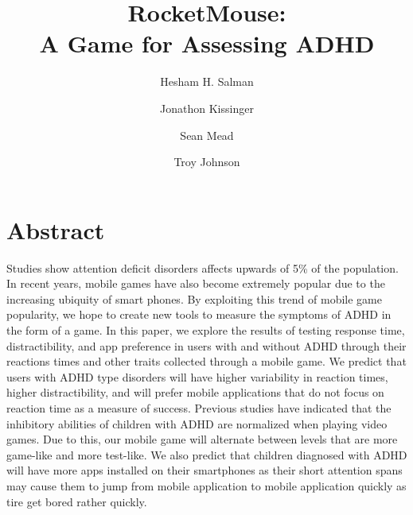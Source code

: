 \documentclass[a4wide]{article}
\title{RocketMouse:\\ A Game for Assessing ADHD}
\author{Hesham H. Salman \and Jonathon Kissinger \and Sean Mead \and Troy Johnson}
\begin{document}
\maketitle


\section{Abstract}
\- Studies show attention deficit disorders affects upwards of 5\% of the population. In recent years, mobile games have also become extremely popular due to the increasing ubiquity of smart phones. By exploiting this trend of mobile game popularity, we hope to create new tools to measure the symptoms of ADHD in the form of a game. In this paper, we explore the results of testing response time, distractibility, and app preference in users with and without ADHD through their reactions times and other traits collected through a mobile game.  We predict that users with ADHD type disorders will have higher variability in reaction times, higher distractibility, and will prefer mobile applications that do not focus on reaction time as a measure of success. Previous studies have indicated that the inhibitory abilities of children with ADHD are normalized when playing video games. Due to this, our mobile game will alternate between levels that are more game-like and more test-like. We also predict that children diagnosed with ADHD will have more apps installed on their smartphones as their short attention spans may cause them to jump from mobile application to mobile application quickly as tire get bored rather quickly.
\end{document}

